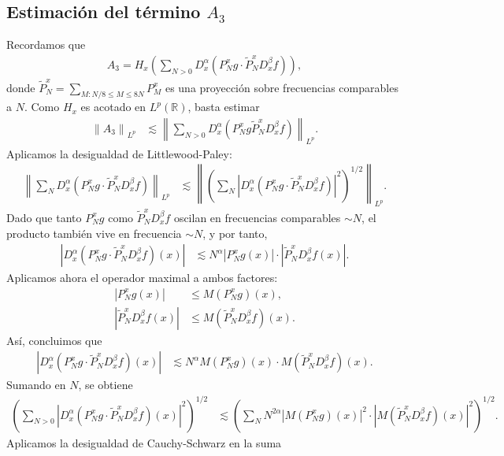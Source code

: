 \documentclass{aleph-revista}
\renewcommand{\tilde}{\widetilde}
\providecommand{\norm}[1]{\left\|#1\right\|}
\begin{document}
\subsection*{Estimación del término $A_3$}
  Recordamos que
  \begin{align*}
    A_3 = H_x\left( \sum_{N > 0} D_x^\alpha \left( P_N^x g \cdot \tilde{P}_N^x D_x^\beta f \right) \right),
  \end{align*}
  donde $\tilde{P}_N^x = \sum_{M : N/8 \leq M \leq 8N} P_M^x$ es una proyección sobre frecuencias comparables a $N$. Como $H_x$ es acotado en $L^p(\mathbb{R})$, basta estimar
  \begin{align*}
    \norm{A_3}_{L^p}&\lesssim \norm{ \sum_{N > 0} D_x^\alpha \left( P_N^x g \tilde{P}_N^x D_x^\beta f \right)}_{L^p}.
  \end{align*}
  Aplicamos la desigualdad de Littlewood-Paley:
  \begin{align*}
    \norm{\sum_{N} D_x^\alpha \left( P_N^x g \cdot \tilde{P}_N^x D_x^\beta f \right)}_{L^p}&\lesssim \norm{\left( \sum_{N} |D_x^\alpha (P_N^x g \cdot \tilde{P}_N^x D_x^\beta f)|^2 \right)^{1/2}}_{L^p}.
  \end{align*}
  Dado que tanto $P_N^x g$ como $\tilde{P}_N^x D_x^\beta f$ oscilan en frecuencias comparables $\sim N$, el producto también vive en frecuencia $\sim N$, y por tanto,
  \begin{align*}
    |D_x^\alpha (P_N^x g \cdot \tilde{P}_N^x D_x^\beta f)(x)|&\lesssim N^\alpha |P_N^x g(x)| \cdot |\tilde{P}_N^x D_x^\beta f(x)|.
  \end{align*}
  Aplicamos ahora el operador maximal a ambos factores:
  \begin{align*}
    |P_N^x g(x)| &\leq M(P_N^x g)(x), \\
    |\tilde{P}_N^x D_x^\beta f(x)| &\leq M(\tilde{P}_N^x D_x^\beta f)(x).
  \end{align*}
  Así, concluimos que
  \begin{align*}
    |D_x^\alpha (P_N^x g \cdot \tilde{P}_N^x D_x^\beta f)(x)|
    &\lesssim N^\alpha M(P_N^x g)(x) \cdot M(\tilde{P}_N^x D_x^\beta f)(x).
  \end{align*}
  Sumando en $N$, se obtiene
  \begin{align*}
    \left(\sum_{N > 0} |D_x^\alpha (P_N^x g \cdot \tilde{P}_N^x D_x^\beta f)(x)|^2\right)^{1/2}&\lesssim \left( \sum_{N} N^{2\alpha} |M(P_N^x g)(x)|^2 \cdot |M(\tilde{P}_N^x D_x^\beta f)(x)|^2 \right)^{1/2}.
  \end{align*}
  Aplicamos la desigualdad de Cauchy-Schwarz en la suma
\end{document}
